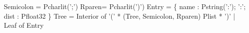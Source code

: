 \begin{code}\scriptsize
{} Semicolon = Pcharlit(';')
 Rparen= Pcharlit(')')
\mbox{}
 Entry = \{
  name : Pstring(':'); ':'; dist : Pfloat32
\}
\mbox{}
 Tree =
  Interior of '(' * (Tree, Semicolon, Rparen) Plist * ')'
| Leaf of Entry\end{code}

